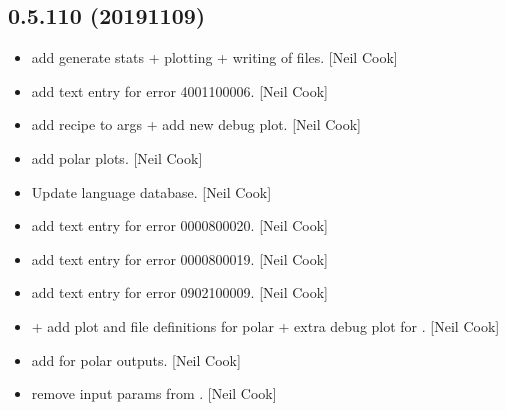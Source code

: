 \documentclass[a4paper,10pt,english]{report}
\begin{document}
\subsection{0.5.110 (2019\sphinxhyphen{}11\sphinxhyphen{}09)}
\label{\detokenize{misc/changelog:id52}}\begin{itemize}
\item {} 
 \sphinxhyphen{} add generate stats + plotting + writing of files.
{[}Neil Cook{]}

\item {} 
 \sphinxhyphen{} add text entry for error 40\sphinxhyphen{}011\sphinxhyphen{}00006. {[}Neil
Cook{]}

\item {} 
 \sphinxhyphen{} add recipe to args + add new debug
plot. {[}Neil Cook{]}

\item {} 
 \sphinxhyphen{} add polar plots. {[}Neil Cook{]}

\item {} 
Update language database. {[}Neil Cook{]}

\item {} 
 \sphinxhyphen{} add text entry for error 00\sphinxhyphen{}008\sphinxhyphen{}00020. {[}Neil Cook{]}

\item {} 
 \sphinxhyphen{} add text entry for error 00\sphinxhyphen{}008\sphinxhyphen{}00019. {[}Neil Cook{]}

\item {} 
 \sphinxhyphen{} add text entry for error 09\sphinxhyphen{}021\sphinxhyphen{}00009. {[}Neil Cook{]}

\item {} 
 +  \sphinxhyphen{}
add plot and file definitions for polar + extra debug plot for
. {[}Neil Cook{]}

\item {} 
 \sphinxhyphen{} add  for polar outputs.
{[}Neil Cook{]}

\item {} 
 \sphinxhyphen{} remove input params from
. {[}Neil Cook{]}


\end{itemize}
\end{document}
